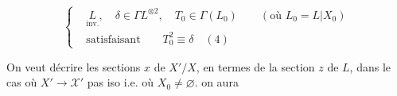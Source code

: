 \[
\left\{\begin{aligned}
&\underset{\text{inv.}}{L},\quad\delta\in\Gamma L^{\otimes 2},\quad T_0\in\Gamma(L_0)\qquad(\text{où }L_0=L|X_0)\\
&\text{satisfaisant}\qquad T_0^2\equiv\delta\quad(4)
\end{aligned}\right.
\]

On veut décrire les sections $x$ de $X'/X$, en termes de la section $z$ de $L$, dans le cas où $X'\longrightarrow\mathcal X'$ pas iso i.e. où $X_0\ne\varnothing$.   on aura

